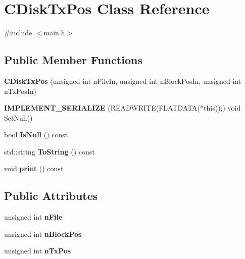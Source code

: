 \hypertarget{class_c_disk_tx_pos}{}\section{C\+Disk\+Tx\+Pos Class Reference}
\label{class_c_disk_tx_pos}


{\ttfamily \#include $<$main.\+h$>$}

\subsection*{Public Member Functions}
\begin{DoxyCompactItemize}
\item 
\mbox{\label{class_c_disk_tx_pos_a2cf11e1b0c8154be066b2d58caddb468}} 
{\bfseries C\+Disk\+Tx\+Pos} (unsigned int n\+File\+In, unsigned int n\+Block\+Pos\+In, unsigned int n\+Tx\+Pos\+In)
\item 
\mbox{\label{class_c_disk_tx_pos_af4d40d5511ba58d5b46104560e521aab}} 
{\bfseries I\+M\+P\+L\+E\+M\+E\+N\+T\+\_\+\+S\+E\+R\+I\+A\+L\+I\+ZE} (R\+E\+A\+D\+W\+R\+I\+TE(F\+L\+A\+T\+D\+A\+TA($\ast$this));) void Set\+Null()
\item 
\mbox{\label{class_c_disk_tx_pos_ae768f5311eb0662c04575a3d2bf47561}} 
bool {\bfseries Is\+Null} () const
\item 
\mbox{\label{class_c_disk_tx_pos_a0537d89b0c7224c8ab4d79cedccc82f3}} 
std\+::string {\bfseries To\+String} () const
\item 
\mbox{\label{class_c_disk_tx_pos_a6c4b9ba155619034191fca523507b926}} 
void {\bfseries print} () const
\end{DoxyCompactItemize}
\subsection*{Public Attributes}
\begin{DoxyCompactItemize}
\item 
\mbox{\label{class_c_disk_tx_pos_a07198e7b96d4c60ece4d895abbd46104}} 
unsigned int {\bfseries n\+File}
\item 
\mbox{\label{class_c_disk_tx_pos_ae9b3c262149c035be43010cbf7d1423b}} 
unsigned int {\bfseries n\+Block\+Pos}
\item 
\mbox{\label{class_c_disk_tx_pos_ad86f9cef782e44a0e5bfe1fae9ed6593}} 
unsigned int {\bfseries n\+Tx\+Pos}
\end{DoxyCompactItemize}
